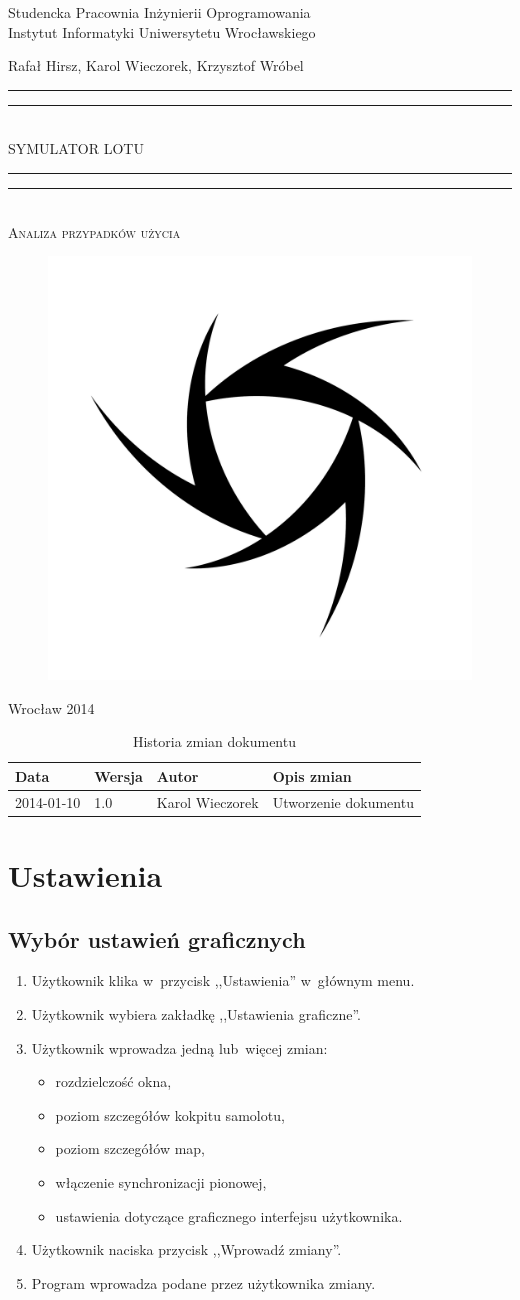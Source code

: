 \documentclass{mwrep}
\newcommand*{\titleGP}{\begingroup
\centering

{\large Studencka Pracownia Inżynierii Oprogramowania}\\Instytut Informatyki Uniwersytetu Wrocławskiego\par
\vspace*{16\baselineskip}

{\Large Rafał Hirsz, Karol Wieczorek, Krzysztof Wróbel\par}
\vspace*{\baselineskip}

\rule{\textwidth}{1.6pt}\vspace*{-\baselineskip}\vspace*{2pt}
\rule{\textwidth}{0.4pt}\\[\baselineskip]

{\Huge SYMULATOR LOTU}\\[0.2\baselineskip]

\rule{\textwidth}{0.4pt}\vspace*{-\baselineskip}\vspace{3.2pt}
\rule{\textwidth}{1.6pt}\\[\baselineskip]

\scshape
{\huge Analiza przypadków użycia}\par
\vspace*{2\baselineskip}

\begin{figure}[h]
\centering
\includegraphics[width=5\baselineskip]{flightsim-team-logo.pdf}
\end{figure}
\vfill

{\large Wrocław 2014}\par

\pagebreak

\endgroup}
\begin{document}
\thispagestyle{empty}
\titleGP

\begin{center}
\begin{table}[h]
\begin{center}
\caption{Historia zmian dokumentu}\label{T:Zmiany}
\vspace{3ex}
\begin{tabularx}{1\textwidth}{|l|l|l|X|}
\hline
Data & Wersja & Autor & Opis zmian \\ \hline
2014-01-10 & 1.0 & Karol Wieczorek & Utworzenie dokumentu \\
\hline
\end{tabularx}
\end{center}
\end{table}
\end{center}

\pagebreak

\tableofcontents

\chapter{Ustawienia}
\section{Wybór ustawień graficznych}
\begin{enumerate}
  \item Użytkownik klika w~przycisk ,,Ustawienia'' w~głównym menu.
  \item Użytkownik wybiera zakładkę ,,Ustawienia graficzne''.
  \item Użytkownik wprowadza jedną lub~więcej zmian:
    \begin{itemize}
      \item rozdzielczość okna,
      \item poziom szczegółów kokpitu samolotu,
      \item poziom szczegółów map,
      \item włączenie synchronizacji pionowej,
      \item ustawienia dotyczące graficznego interfejsu użytkownika.
    \end{itemize}
  \item Użytkownik naciska przycisk ,,Wprowadź zmiany''.
  \item Program wprowadza podane przez użytkownika zmiany.
\end{enumerate}
\end{document}
